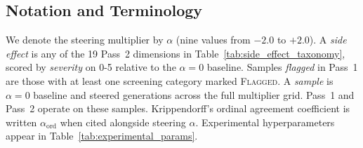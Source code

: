 
\subsection{Notation and Terminology}
We denote the steering multiplier by $\alpha$ (nine values from $-2.0$ to $+2.0$).
A \textit{side effect} is any of the 19 Pass~2 dimensions in Table~\ref{tab:side_effect_taxonomy}, scored by \textit{severity} on 0-5 relative to the $\alpha{=}0$ baseline.
Samples \textit{flagged} in Pass~1 are those with at least one screening category marked \textsc{Flagged}.
A \textit{sample} is $\alpha{=}0$ baseline and steered generations across the full multiplier grid.
Pass~1 and Pass~2 operate on these samples.
Krippendorff's ordinal agreement coefficient is written $\alpha_{\mathrm{ord}}$ when cited alongside steering $\alpha$.
Experimental hyperparameters appear in Table~\ref{tab:experimental_params}.

